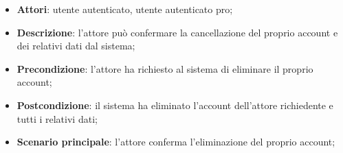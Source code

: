 \begin{itemize}
	\item \textbf{Attori}: utente autenticato, utente autenticato pro;
	\item \textbf{Descrizione}: l'attore può confermare la cancellazione del proprio account e dei relativi dati dal sistema;
	\item \textbf{Precondizione}: l'attore ha richiesto al sistema di eliminare il proprio account;
	\item \textbf{Postcondizione}: il sistema ha eliminato l'account dell'attore richiedente e tutti i relativi dati;
	\item \textbf{Scenario principale}: l'attore conferma l'eliminazione del proprio account;
\end{itemize}